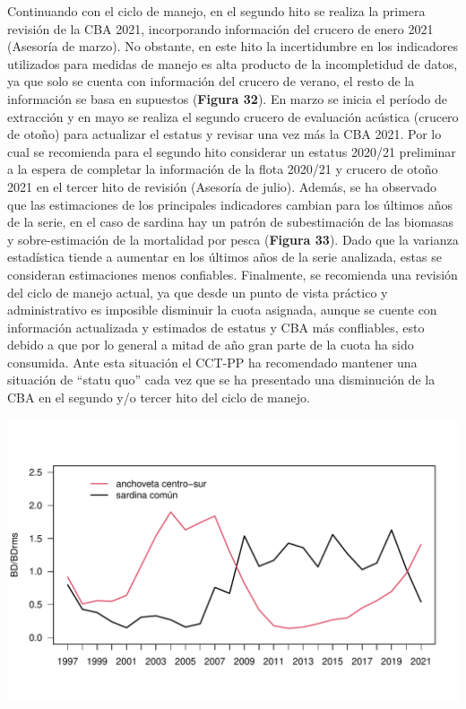 \documentclass[
  spanish,
]{article}
\begin{document}
Continuando con el ciclo de manejo, en el segundo hito se realiza la
primera revisión de la CBA 2021, incorporando información del crucero de
enero 2021 (Asesoría de marzo). No obstante, en este hito la
incertidumbre en los indicadores utilizados para medidas de manejo es
alta producto de la incompletidud de datos, ya que solo se cuenta con
información del crucero de verano, el resto de la información se basa en
supuestos (\textbf{Figura 32}). En marzo se inicia el período de
extracción y en mayo se realiza el segundo crucero de evaluación
acústica (crucero de otoño) para actualizar el estatus y revisar una vez
más la CBA 2021. Por lo cual se recomienda para el segundo hito
considerar un estatus 2020/21 preliminar a la espera de completar la
información de la flota 2020/21 y crucero de otoño 2021 en el tercer
hito de revisión (Asesoría de julio). Además, se ha observado que las
estimaciones de los principales indicadores cambian para los últimos
años de la serie, en el caso de sardina hay un patrón de subestimación
de las biomasas y sobre-estimación de la mortalidad por pesca
(\textbf{Figura 33}). Dado que la varianza estadística tiende a aumentar
en los últimos años de la serie analizada, estas se consideran
estimaciones menos confiables. Finalmente, se recomienda una revisión
del ciclo de manejo actual, ya que desde un punto de vista práctico y
administrativo es imposible disminuir la cuota asignada, aunque se
cuente con información actualizada y estimados de estatus y CBA más
confliables, esto debido a que por lo general a mitad de año gran parte
de la cuota ha sido consumida. Ante esta situación el CCT-PP ha
recomendado mantener una situación de ``statu quo'' cada vez que se ha
presentado una disminución de la CBA en el segundo y/o tercer hito del
ciclo de manejo.

\begin{center}\includegraphics{FigurasInforme_Marzo/Fig6_ant-1} \end{center}
\end{document}
